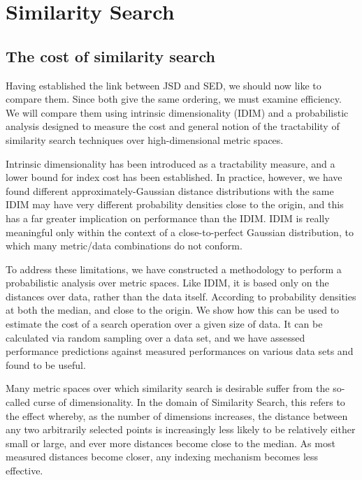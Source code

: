\chapter{Similarity Search}\label{ch:similarity_search}
\section{The cost of similarity search}
Having established the link between JSD and SED, we should now like to compare them.  Since both give the same ordering, we must examine efficiency.  We will compare them using intrinsic dimensionality (IDIM) and a probabilistic analysis designed to measure the cost and general notion of the tractability of similarity search techniques over high-dimensional metric spaces.  

Intrinsic dimensionality has been introduced as a tractability measure\cite{}, and a lower bound for index cost has been established. In practice, however, we have found different approximately-Gaussian distance distributions with the same IDIM may have very different probability densities close to the origin, and this has a far greater implication on performance than the IDIM. IDIM is really meaningful only within the context of a close-to-perfect Gaussian distribution, to which many metric/data combinations do not conform.

To address these limitations, we have constructed a methodology to perform a probabilistic analysis over metric spaces. Like IDIM, it is based
only on the distances over data, rather than the data itself. According to probability densities at both the median, and close to the origin. We show how this can be used to estimate the cost of a search operation over a given size of data.  It can be calculated via random sampling over a data set, and we have assessed performance predictions against measured performances on various data sets and found to be useful.

Many metric spaces over which similarity search is desirable suffer from the so-called curse of dimensionality. In the domain of Similarity Search, this refers to the effect whereby, as the number of dimensions increases, the distance between any two arbitrarily selected points is increasingly less likely to be relatively either small or large, and ever more distances become close to the median. As most measured distances become closer, any indexing mechanism becomes less effective.

